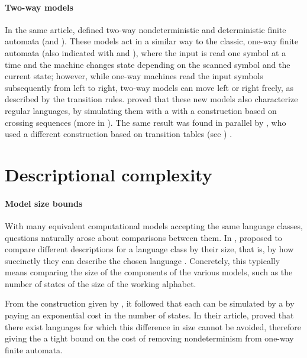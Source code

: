 \paragraph{Two-way models} In the same article, \citeauthor{RabSco59} defined two-way nondeterministic and deterministic finite automata (\TNFA and \TDFA).
These models act in a similar way to the classic, one-way finite automata (also indicated with \ONFA and \ODFA), where the input is read one symbol at a time and the machine changes state depending on the scanned symbol and the current state; however, while one-way machines read the input symbols subsequently from left to right, two-way models can move left or right freely, as described by the transition rules.
\citeauthor{RabSco59} proved that these new models also characterize regular languages, by simulating them with a \ONFA with a construction based on crossing sequences (more in ).
The same result was found in parallel by \citeauthor{She59}, who used a different construction based on transition tables (see ) \cite{She59}.



\section{Descriptional complexity}

\paragraph{Model size bounds} With many equivalent computational models accepting the same language classes, questions naturally arose about comparisons between them.
In \citeyear{MeyFis71}, \citeauthor{MeyFis71} proposed to compare different descriptions for a language class by their size, that is, by how succinctly they can describe the chosen language \cite{MeyFis71}.
Concretely, this typically means comparing the size of the components of the various models, such as the number of states of the size of the working alphabet.

From the construction given by \cite{RabSco59}, it followed that each \NFA can be simulated by a \DFA by paying an exponential cost in the number of states.
In their article, \citeauthor{MeyFis71} proved that there exist languages for which this difference in size cannot be avoided, therefore giving the a tight bound on the cost of removing nondeterminism from one-way finite automata.


